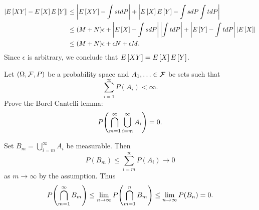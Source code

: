 \begin{solution}
\begin{equation*}
        \begin{split}
            \left\lvert {E\left[ {XY} \right] - E\left[ {X} \right]E\left[ {Y} \right]} \right\rvert 
            &\leq \left\lvert {E\left[ {XY} \right] - \int stdP} \right\rvert + \left\lvert {E\left[ {X} \right]E\left[ {Y} \right] - \int s dP \int t dP} \right\rvert \\ 
            &\leq (M+N)\epsilon + \left\lvert {E\left[ {X} \right] - \int sdP} \right\rvert\left\lvert {\int t dP} \right\rvert + \left\lvert {E\left[ {Y} \right] - \int tdP} \right\rvert\left\lvert {E\left[ {X} \right]} \right\rvert \\ 
            &\leq (M+N)\epsilon + \epsilon N + \epsilon M.
        \end{split}
    \end{equation*}
    Since $\epsilon$ is arbitrary, we conclude that $E\left[ {XY} \right] = E\left[ {X} \right]E\left[ {Y} \right]$.
\end{solution}

\begin{exercise}{2.6}\label{ex:2.6}
    Let $(\Omega,\mathcal{F},P)$ be a probability space and $A_1,\ldots\in\mathcal{F}$ be sets such that 
    \begin{equation*}
        \sum_{i=1}^\infty P(A_i) < \infty.
    \end{equation*}
    Prove the Borel-Cantelli lemma:
    \begin{equation*}
        P\pth{\bigcap_{m=1}^\infty\bigcup_{i=m}^\infty A_i} = 0.
    \end{equation*}
\end{exercise}
\begin{solution}
    Set $B_m = \bigcup_{i=m}^\infty A_i$ be measurable. Then 
    \begin{equation*}
        P(B_m) \leq \sum_{i=m}^\infty P(A_i) \to 0
    \end{equation*}
    as $m\to\infty$ by the assumption. Thus 
    \begin{equation*}
        P\pth{\bigcap_{m=1}^\infty B_m} \leq \lim_{n\to\infty} P\pth{\bigcap_{m=1}^n B_m}
        \leq \lim_{n\to\infty} P(B_n) = 0.
    \end{equation*}
\end{solution}

